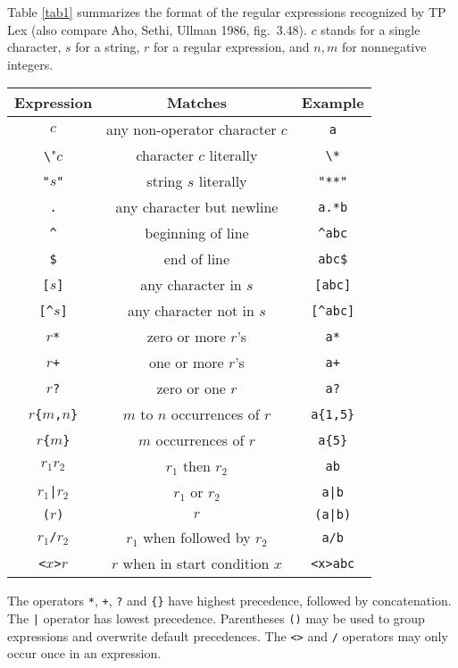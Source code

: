 Table \ref{tab1} summarizes the format of the regular expressions
recognized by TP Lex (also compare Aho, Sethi, Ullman 1986, fig.\ 3.48).
$c$ stands for a single character, $s$ for a string, $r$ for a regular
expression, and $n,m$ for nonnegative integers.

\begin{table*}\centering
   \begin{tabular}{c|c|c}
      \hline\hline
      {\sc Expression}& {\sc Matches}& {\sc Example}\\
      \hline
      $c$& any non-operator character $c$& \verb"a"\\
      \verb"\"$c$& character $c$ literally& \verb"\*"\\
      \verb'"'$s$\verb'"'& string $s$ literally& \verb'"**"'\\
      \verb"."& any character but newline& \verb"a.*b"\\
      \verb"^"& beginning of line& \verb"^abc"\\
      \verb"$"& end of line& \verb"abc$"\\
      \verb"["$s$\verb"]"& any character in $s$& \verb"[abc]"\\
      \verb"[^"$s$\verb"]"& any character not in $s$& \verb"[^abc]"\\
      $r$\verb"*"& zero or more $r$'s& \verb"a*"\\
      $r$\verb"+"& one or more $r$'s& \verb"a+"\\
      $r$\verb"?"& zero or one $r$& \verb"a?"\\
      $r$\verb"{"$m$\verb","$n$\verb"}"& $m$ to $n$ occurrences of $r$& \verb"a{1,5}"\\
      $r$\verb"{"$m$\verb"}"& $m$ occurrences of $r$& \verb"a{5}"\\
      $r_1r_2$& $r_1$ then $r_2$& \verb"ab"\\
      $r_1$\verb"|"$r_2$& $r_1$ or $r_2$& \verb"a|b"\\
      \verb"("$r$\verb")"& $r$& \verb"(a|b)"\\
      $r_1$\verb"/"$r_2$& $r_1$ when followed by $r_2$& \verb"a/b"\\
      \verb"<"$x$\verb">"$r$& $r$ when in start condition $x$& \verb"<x>abc"\\
      \hline
   \end{tabular}
   \caption{Regular expressions.}
   \label{tab1}
\end{table*}

The operators \verb"*", \verb"+", \verb"?" and \verb"{}" have highest
precedence, followed by concatenation. The \verb"|" operator has lowest
precedence. Parentheses \verb"()" may be used to group expressions and
overwrite default precedences. The \verb"<>" and \verb"/" operators may only
occur once in an expression.

